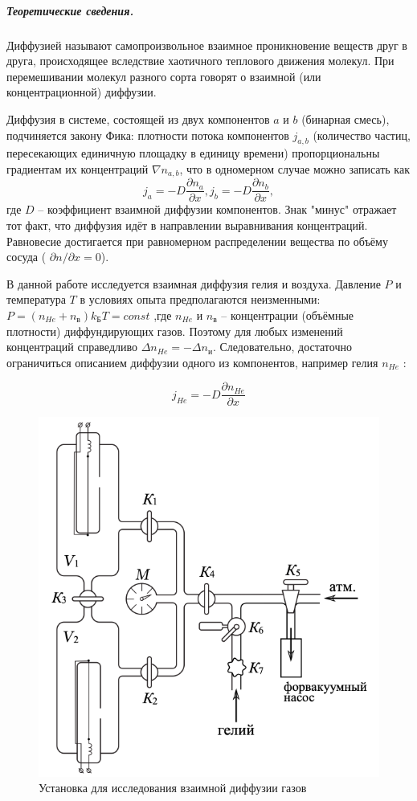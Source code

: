 \documentclass[a4paper,12pt]{article}
\begin{document}
\subparagraph*{Теоретические сведения.} Диффузией называют самопроизвольное взаимное проникновение веществ друг в друга, происходящее вследствие хаотичного теплового движения молекул. При перемешивании молекул разного сорта говорят о взаимной (или концентрационной) диффузии.

Диффузия в системе, состоящей из двух компонентов $a$ и $b$ (бинарная смесь), подчиняется закону Фика: плотности потока компонентов  $j_{a, b}$ (количество частиц, пересекающих единичную площадку в единицу времени) пропорциональны градиентам их концентраций $\nabla n_{a, b}$, что в одномерном случае можно записать как
$$
j_a = -D\frac{\partial n_a}{\partial x}, j_b= -D\frac{\partial n_b}{\partial x}, 
$$
 где $D $ -- коэффициент взаимной диффузии компонентов. Знак "минус" отражает тот факт, что диффузия идёт в направлении выравнивания концентраций. Равновесие достигается при равномерном распределении вещества по объёму сосуда ( $\partial n / \partial x = 0$).
 
 В данной работе исследуется взаимная диффузия гелия и воздуха. Давление $P$ и температура $T$ в условиях опыта предполагаются неизменными: $P = (n_{He}+ n_в)k_БT=const$ ,где $n_{He}$ и $n_в$ -- концентрации (объёмные плотности) диффундирующих газов. Поэтому для любых изменений концентраций справедливо $\Delta n_{He} = - \Delta n_и$. Следовательно, достаточно ограничиться
 описанием диффузии одного из компонентов, например гелия $n_{He}$ :
 
 \begin{equation}\label{1}
j_{He}= -D\frac{\partial n_{He}}{\partial x}
 \end{equation}
 
 
  	\begin{figure} 
 	\centering 
 	\includegraphics[scale=0.25]{1.jpg} 
 	\caption{Установка для исследования взаимной диффузии газов} 
 \end{figure}
 
\end{document}
